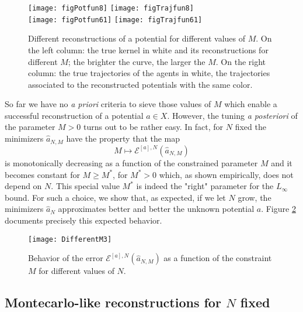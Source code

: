 \begin{figure}[h!]
\begin{center}
\hspace{-0.7cm}\texttt{[image: figPotfun8]}\hspace{-0.9cm}
\texttt{[image: figTrajfun8]}\\
\hspace{-0.7cm}\texttt{[image: figPotfun61]}\hspace{-0.9cm}
\texttt{[image: figTrajfun61]}
\end{center}
\caption{Different reconstructions of a potential for different values of $M$. On the left column: the true kernel in white and its reconstructions for different $M$; the brighter the curve, the larger the $M$. On the right column: the true trajectories of the agents in white, the trajectories associated to the reconstructed potentials with the same color.}\label{Mconstr1}
\end{figure}

So far we have no  {\it a priori} criteria to sieve those values of $M$ which enable a successful reconstruction of a potential $a \in X$. However,  the tuning {\it a posteriori} of the parameter $M>0$ turns out to be rather easy. In fact, for $N$ fixed the minimizers $\widehat a_{N,M}$ have the property that the map
$$
 M \mapsto   \mathcal E^{[a],N}(\widehat a_{N,M})
$$
is monotonically decreasing as a function of the constrained parameter $M$ and it becomes constant for $M\geq M^*$, for $M^*>0$ which, as shown empirically, does not depend on $N$. This special value $M^*$ is indeed the "right" parameter for the $L_\infty$ bound. For such a choice, we show that, as expected, if we let $N$ grow, the minimizers $\widehat{a}_N$ approximates better and better the unknown potential $a$. 
Figure \ref{Mconstr} documents precisely this expected behavior.

\begin{figure}[h!]
\begin{center}
\texttt{[image: DifferentM3]}
\end{center}
\caption{Behavior of the error $\mathcal E^{[a],N}(\widehat a_{N,M})$ as a function of the constraint $M$ for different values of $N$.}\label{Mconstr}
\end{figure}

\subsection{Montecarlo-like reconstructions for $N$ fixed}

